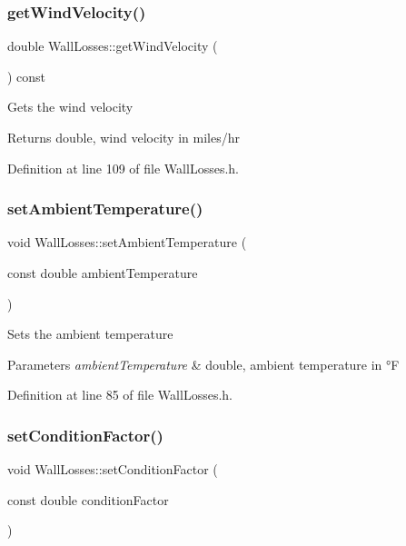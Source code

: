 \subsubsection{\texorpdfstring{get\+Wind\+Velocity()}{getWindVelocity()}}
{\footnotesize\ttfamily double Wall\+Losses\+::get\+Wind\+Velocity (\begin{DoxyParamCaption}{ }\end{DoxyParamCaption}) const\hspace{0.3cm}{\ttfamily [inline]}}

Gets the wind velocity \begin{DoxyReturn}{Returns}
double, wind velocity in miles/hr 
\end{DoxyReturn}


Definition at line 109 of file Wall\+Losses.\+h.

\mbox{\label{class_wall_losses_a08a8f4c9add0ce78733be4558cc8410b}} 
\subsubsection{\texorpdfstring{set\+Ambient\+Temperature()}{setAmbientTemperature()}}
{\footnotesize\ttfamily void Wall\+Losses\+::set\+Ambient\+Temperature (\begin{DoxyParamCaption}\item[{const double}]{ambient\+Temperature }\end{DoxyParamCaption})\hspace{0.3cm}{\ttfamily [inline]}}

Sets the ambient temperature 
\begin{DoxyParams}{Parameters}
{\em ambient\+Temperature} & double, ambient temperature in °F \\
\hline
\end{DoxyParams}


Definition at line 85 of file Wall\+Losses.\+h.

\mbox{\label{class_wall_losses_a1533a7513460d22f433fb670700573a2}} 
\subsubsection{\texorpdfstring{set\+Condition\+Factor()}{setConditionFactor()}}
{\footnotesize\ttfamily void Wall\+Losses\+::set\+Condition\+Factor (\begin{DoxyParamCaption}\item[{const double}]{condition\+Factor }\end{DoxyParamCaption})\hspace{0.3cm}{\ttfamily [inline]}}


